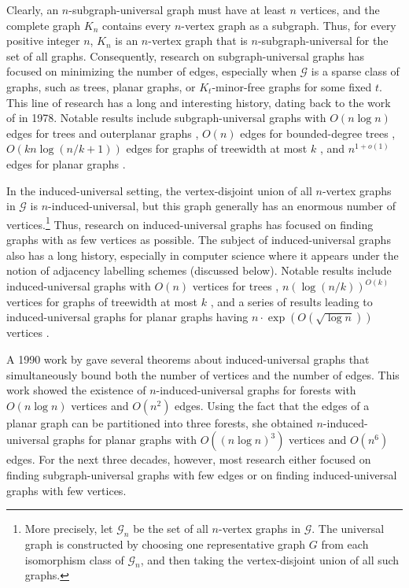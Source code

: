 \documentclass{patmorin}
\newcommand{\Oh}{O}
\newcommand{\calG}{\mathcal{G}}
\begin{document}
Clearly, an $n$-subgraph-universal graph must have at least $n$ vertices, and the complete graph $K_n$ contains every $n$-vertex graph as a subgraph. Thus, for every positive integer $n$, $K_n$ is an $n$-vertex graph that is $n$-subgraph-universal for the set of all graphs. Consequently, research on subgraph-universal graphs has focused on minimizing the number of edges, especially when $\calG$ is a sparse class of graphs, such as trees, planar graphs, or $K_t$-minor-free graphs for some fixed $t$.  This line of research has a long and interesting history, dating back to the work of \citet{chung.graham.ea:on} in 1978.  Notable results include subgraph-universal graphs with $\Oh(n\log n)$ edges for trees and outerplanar graphs \cite{chung.graham.ea:on,chung:universal,kaul.kim.ea:universal}, $\Oh(n)$ edges for bounded-degree trees \cite{bhatt.chung.ea:universal}, $\Oh(kn \log (n/k+1))$ edges for graphs of treewidth at most $k$ \cite{kaul.kim.ea:universal}, and $n^{1+o(1)}$ edges for planar graphs \cite{EJM23}.

In the induced-universal setting, the vertex-disjoint union of all $n$-vertex graphs in $\calG$ is $n$-induced-universal, but this graph generally has an enormous number of vertices.\footnote{More precisely, let $\calG_n$ be the set of all $n$-vertex graphs in $\calG$. The universal graph is constructed by choosing one representative graph $G$ from each isomorphism class of $\calG_n$, and then taking the vertex-disjoint union of all such graphs.}  Thus, research on induced-universal graphs has focused on finding graphs with as few vertices as possible.  The subject of induced-universal graphs also has a long history, especially in computer science where it appears under the notion of adjacency labelling schemes (discussed below).  Notable results include induced-universal graphs with $\Oh(n)$ vertices for trees \cite{alstrup.dahlgaard.ea:optimal}, $n(\log(n/k))^{\Oh(k)}$ vertices for graphs of treewidth at most $k$ \cite{gavoille.labourel:shorter}, and a series of results leading to induced-universal graphs for planar graphs having $n\cdot\exp(\Oh(\sqrt{\log n}))$ vertices \cite{kannan.naor.ea:implicit,gavoille.labourel:shorter,chung:universal,spinrad:efficient,BGP22,dujmovic.esperet.ea:adjacency,gawrychowski.janczewski:simpler}.

A 1990 work by \citet{chung:universal} gave several theorems about induced-universal graphs that simultaneously bound both the number of vertices and the number of edges. This work showed the existence of $n$-induced-universal graphs for forests with $\Oh(n\log n)$ vertices and $\Oh(n^2)$ edges. Using the fact that the edges of a planar graph can be partitioned into three forests, she obtained $n$-induced-universal graphs for planar graphs with $\Oh((n\log n)^3)$ vertices and $\Oh(n^6)$ edges. For the next three decades, however, most research either focused on finding subgraph-universal graphs with few edges or on finding induced-universal graphs with few vertices.
\end{document}
